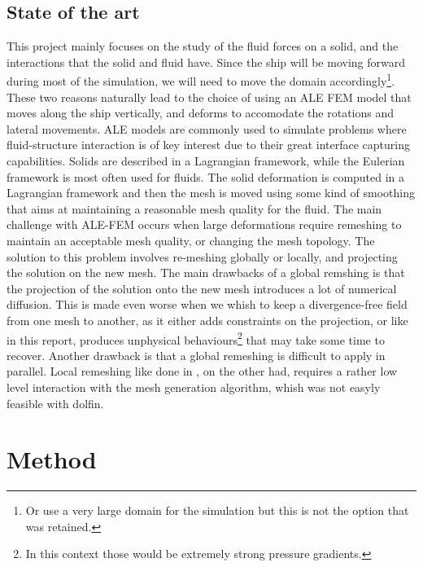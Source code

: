 \documentclass[a4paper]{article}
\begin{document}
\subsection{State of the art}
This project mainly focuses on the study of the fluid forces on a solid, and the interactions that the solid and fluid have. Since the ship will be moving forward during most of the simulation, we will need to move the domain accordingly\footnote{Or use a very large domain for the simulation but this is not the option that was retained.}. These two reasons naturally lead to the choice of using an ALE FEM model that moves along the ship vertically, and deforms to accomodate the rotations and lateral movements. ALE models are commonly used to simulate problems where fluid-structure interaction is of key interest\cite{Jeannette2020Apr}\cite{Wang2018Jul} due to their great interface capturing capabilities. Solids are described in a Lagrangian framework, while the Eulerian framework is most often used for fluids. The solid deformation is computed in a Lagrangian framework and then the mesh is moved using some kind of smoothing that aims at maintaining a reasonable mesh quality for the fluid.  The main challenge with ALE-FEM occurs when large deformations require remeshing to maintain an acceptable mesh quality, or changing the mesh topology. The solution to this problem involves re-meshing globally or locally, and projecting the solution on the new mesh\cite{Remacle2010May}. The main drawbacks of a global remshing is that the projection of the solution onto the new mesh introduces a lot of numerical diffusion. This is made even worse when we whish to keep a divergence-free field from one mesh to another, as it either adds constraints on the projection, or like in this report, produces unphysical behaviours\footnote{In this context those would be extremely strong pressure gradients.} that may take some time to recover. Another drawback is that a global remeshing is difficult to apply in parallel. Local remeshing like done in \cite{Remacle2010May}, on the other had, requires a rather low level interaction with the mesh generation algorithm, whish was not easyly feasible with dolfin.

\section{Method}



\newpage


\end{document}
